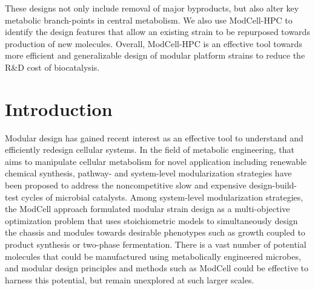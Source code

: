     These designs not only include removal of major byproducts, but also alter key metabolic branch-points in central metabolism.
    We also use ModCell-HPC to identify the design features that allow an existing strain to be repurposed towards production of new molecules.
    Overall, ModCell-HPC is an effective tool towards more efficient and generalizable design of modular platform strains to reduce the R\&D cost of  biocatalysis.


\section{Introduction}

Modular design has gained recent interest as an effective tool to understand and efficiently redesign cellular systems. \citep{garcia2019b}
In the field of metabolic engineering, that aims to manipulate cellular metabolism for novel application including renewable chemical synthesis, pathway-\citep{biggs2014} and system-level\citep{trinh2015,garcia2019,garcia2019c,garcia2019d} modularization strategies have been proposed to address the noncompetitive slow and expensive design-build-test cycles of microbial catalysts.\citep{nielsen2016}
Among system-level modularization strategies, the ModCell approach formulated modular strain design as a multi-objective optimization problem that uses stoichiometric models to simultaneously design the chassis and modules towards desirable phenotypes such as growth coupled to product synthesis or two-phase fermentation.\citep{garcia2019}
There is a vast number of potential molecules that could be manufactured using metabolically engineered microbes,\citep{trinh2016} and modular design principles and methods such as ModCell could be effective to harness this potential, but remain unexplored at such larger scales. %

